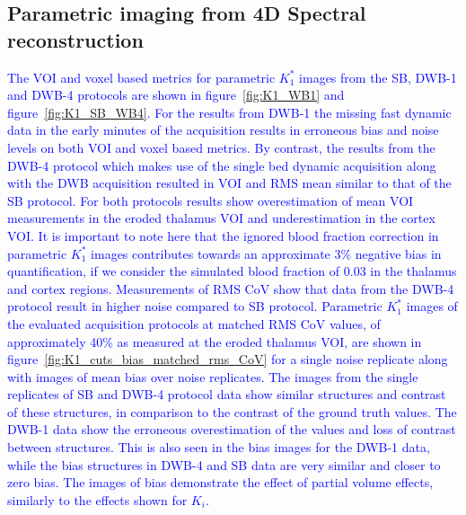 \subsection*{Parametric  imaging from 4D Spectral reconstruction}
\textcolor{blue}{
The VOI and voxel based metrics for parametric $K_1^*$ images from the SB, DWB-1 and DWB-4 protocols are shown in figure~\ref{fig:K1_WB1} and figure~\ref{fig:K1_SB_WB4}. For the results from DWB-1 the missing fast dynamic data in the early minutes of the acquisition results in erroneous bias and noise levels on both VOI and voxel based metrics. By contrast, the results from the DWB-4 protocol which makes use of the single bed dynamic acquisition along with the DWB acquisition resulted in VOI and RMS mean similar to that of the SB protocol. For both protocols results show overestimation of mean VOI measurements in the eroded thalamus VOI and underestimation in the cortex VOI. It is important to note here that the ignored blood fraction correction in parametric $K_1^*$ images contributes towards an approximate 3\% negative bias in quantification, if we consider the simulated blood fraction of 0.03 in the thalamus and cortex regions.
Measurements of RMS CoV show that data from the DWB-4 protocol result in higher noise compared to SB protocol.
Parametric $K_1^*$ images of the evaluated acquisition protocols at matched RMS CoV values, of approximately 40\% as measured at the eroded thalamus VOI, are shown in figure~\ref{fig:K1_cuts_bias_matched_rms_CoV} for a single noise replicate along with images of mean bias over noise replicates. The images from the single replicates of SB and DWB-4 protocol data show similar structures and contrast of these structures, in comparison to the contrast of the ground truth values. The DWB-1 data show the erroneous overestimation of the values and loss of contrast between structures. This is also seen in the bias images for the DWB-1 data, while the bias structures in DWB-4 and SB data are very similar and closer to zero bias. The images of bias demonstrate the effect of partial volume effects, similarly to the effects shown for $K_i$.}

